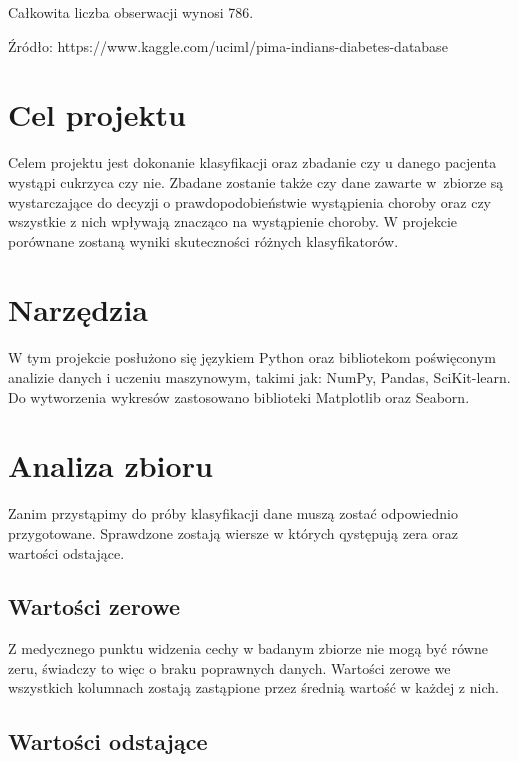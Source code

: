 \documentclass[12pt]{article}
\begin{document}
Całkowita liczba obserwacji wynosi 786.

Źródło: https://www.kaggle.com/uciml/pima-indians-diabetes-database


\pagebreak
\section{Cel projektu}

Celem projektu jest dokonanie klasyfikacji oraz zbadanie czy u danego pacjenta wystąpi cukrzyca czy nie. Zbadane zostanie także czy dane zawarte w~zbiorze są wystarczające do decyzji o prawdopodobieństwie wystąpienia choroby oraz czy wszystkie z nich wpływają znacząco na wystąpienie choroby.
W projekcie porównane zostaną wyniki skuteczności różnych klasyfikatorów.

\section{Narzędzia}
	W tym projekcie posłużono się językiem Python oraz bibliotekom poświęconym analizie danych i uczeniu maszynowym, takimi jak: NumPy, Pandas, SciKit-learn. Do wytworzenia wykresów zastosowano biblioteki Matplotlib oraz Seaborn.


\section{Analiza zbioru}

Zanim przystąpimy do próby klasyfikacji dane muszą zostać odpowiednio przygotowane. Sprawdzone zostają wiersze w których qystępują zera oraz wartości odstające.

\subsection{Wartości zerowe}

Z medycznego punktu widzenia cechy w badanym zbiorze nie mogą być równe zeru, świadczy to więc o braku poprawnych danych. Wartości zerowe we wszystkich kolumnach zostają zastąpione przez średnią wartość w każdej z nich. 

\subsection{Wartości odstające}
\end{document}

